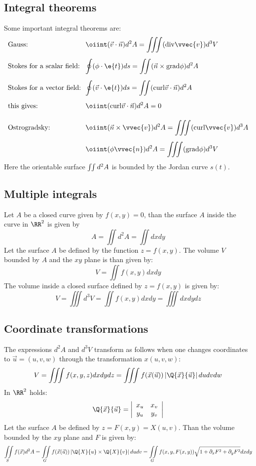 \subsection{Integral theorems}
Some important integral theorems are:
\[
\begin{array}{l@{~~}l}
\mbox{Gauss:}&\displaystyle\oiint(\vec{v}\cdot\vec{n})d^2A=\iiint({\rm div}\vvec{v})d^3V\\[5mm]
\mbox{Stokes for a scalar field:}&\displaystyle\oint(\phi\cdot\e{t})ds=\iint(\vec{n}\times{\rm grad}\phi)d^2A\\[5mm]
\mbox{Stokes for a vector field:}&\displaystyle\oint(\vec{v}\cdot\e{t})ds=\iint({\rm curl}\vec{v}\cdot\vec{n})d^2A\\[5mm]
\mbox{this gives:}&\displaystyle\oiint({\rm curl}\vec{v}\cdot\vec{n})d^2A=0\\[5mm]
\mbox{Ostrogradsky:}&\displaystyle\oiint(\vec{n}\times\vvec{v})d^2A=\iiint({\rm curl}\vvec{v})d^3A\\[5mm]
\mbox{}&\displaystyle\oiint(\phi\vvec{n})d^2A=\iiint({\rm grad}\phi)d^3V
\end{array}
\]
Here the orientable surface $\int\hspace{-1mm}\int d^2A$ is bounded by the
Jordan curve $s(t)$.

\subsection{Multiple integrals}
Let $A$ be a closed curve given by $f(x,y)=0$, than the surface $A$ inside
the curve in $\RR^2$ is given by
\[
A=\iint d^2A=\iint dxdy
\]
Let the surface $A$ be defined by the function $z=f(x,y)$. The volume $V$
bounded by $A$ and the $xy$ plane is than given by:
\[
V=\iint f(x,y)dxdy
\]
The volume inside a closed surface defined by $z=f(x,y)$ is given by:
\[
V=\iiint d^3V=\iint f(x,y)dxdy=\iiint dxdydz
\]

\subsection{Coordinate transformations}
The expressions $d^2A$ and $d^3V$ transform as follows when one changes
coordinates to $\vec{u}=(u,v,w)$ through the transformation $x(u,v,w)$:
\[
V=\iiint f(x,y,z)dxdydz=\iiint f(\vec{x}(\vec{u}))\left|\Q{\vec{x}}{\vec{u}}\right|dudvdw
\]
In $\RR^2$ holds:
\[
\Q{\vec{x}}{\vec{u}}=\left|\begin{array}{cc}x_u&x_v\\ y_u&y_v\end{array}\right|
\]
Let the surface $A$ be defined by $z=F(x,y)=X(u,v)$. Than the volume bounded by
the $xy$ plane and $F$ is given by:
\[
\iint\limits_Sf(\vec{x})d^2A=\iint\limits_Gf(\vec{x}(\vec{u}))
\left|\Q{X}{u}\times\Q{X}{v}\right|dudv=
\iint\limits_Gf(x,y,F(x,y))\sqrt{1+\partial_xF^2+\partial_yF^2}dxdy
\]

